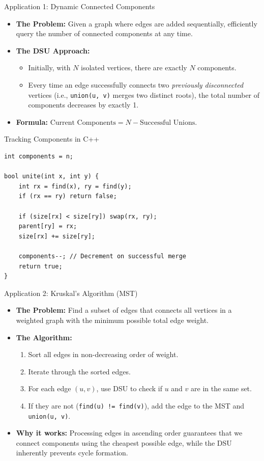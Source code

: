 \documentclass{beamer}
\begin{document}
\begin{frame}{Application 1: Dynamic Connected Components}
    \begin{itemize}
        \item \textbf{The Problem:} Given a graph where edges are added sequentially, efficiently query the number of connected components at any time.
        \item \textbf{The DSU Approach:}
        \begin{itemize}
            \item Initially, with $N$ isolated vertices, there are exactly $N$ components.
            \item Every time an edge successfully connects two \textit{previously disconnected} vertices (i.e., \texttt{union(u, v)} merges two distinct roots), the total number of components decreases by exactly 1.
        \end{itemize}
        \item \textbf{Formula:} $\text{Current Components} = N - \text{Successful Unions}$.
    \end{itemize}
\end{frame}

\begin{frame}[fragile]{Tracking Components in C++}
\begin{verbatim}
int components = n;

bool unite(int x, int y) {
    int rx = find(x), ry = find(y);
    if (rx == ry) return false;

    if (size[rx] < size[ry]) swap(rx, ry);
    parent[ry] = rx;
    size[rx] += size[ry];
    
    components--; // Decrement on successful merge
    return true;
}
\end{verbatim}
\end{frame}

\begin{frame}{Application 2: Kruskal's Algorithm (MST)}
    \begin{itemize}
        \item \textbf{The Problem:} Find a subset of edges that connects all vertices in a weighted graph with the minimum possible total edge weight.
        \item \textbf{The Algorithm:}
        \begin{enumerate}
            \item Sort all edges in non-decreasing order of weight.
            \item Iterate through the sorted edges.
            \item For each edge $(u, v)$, use DSU to check if $u$ and $v$ are in the same set.
            \item If they are not (\texttt{find(u) != find(v)}), add the edge to the MST and \texttt{union(u, v)}.
        \end{enumerate}
        \item \textbf{Why it works:} Processing edges in ascending order guarantees that we connect components using the cheapest possible edge, while the DSU inherently prevents cycle formation.
    \end{itemize}
\end{frame}
\end{document}
